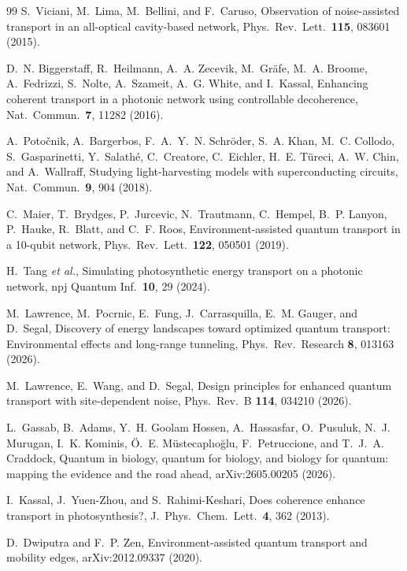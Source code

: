 \documentclass[aps,pre,preprint,floatfix]{revtex4-2}
\begin{document}
\begin{thebibliography}{99}
S.~Viciani, M.~Lima, M.~Bellini, and F.~Caruso,
Observation of noise-assisted transport in an all-optical cavity-based
network,
Phys.\ Rev.\ Lett.\ \textbf{115}, 083601 (2015).

D.~N. Biggerstaff, R.~Heilmann, A.~A. Zecevik, M.~Gr\"{a}fe, M.~A. Broome,
A.~Fedrizzi, S.~Nolte, A.~Szameit, A.~G. White, and I.~Kassal,
Enhancing coherent transport in a photonic network using controllable
decoherence,
Nat.\ Commun.\ \textbf{7}, 11282 (2016).

A.~Poto\v{c}nik, A.~Bargerbos, F.~A.~Y.~N. Schr\"{o}der, S.~A. Khan,
M.~C. Collodo, S.~Gasparinetti, Y.~Salath\'{e}, C.~Creatore, C.~Eichler,
H.~E. T\"{u}reci, A.~W. Chin, and A.~Wallraff,
Studying light-harvesting models with superconducting circuits,
Nat.\ Commun.\ \textbf{9}, 904 (2018).

C.~Maier, T.~Brydges, P.~Jurcevic, N.~Trautmann, C.~Hempel, B.~P. Lanyon,
P.~Hauke, R.~Blatt, and C.~F. Roos,
Environment-assisted quantum transport in a 10-qubit network,
Phys.\ Rev.\ Lett.\ \textbf{122}, 050501 (2019).

H.~Tang \textit{et al.},
Simulating photosynthetic energy transport on a photonic network,
npj Quantum Inf.\ \textbf{10}, 29 (2024).

M.~Lawrence, M.~Pocrnic, E.~Fung, J.~Carrasquilla, E.~M. Gauger, and D.~Segal,
Discovery of energy landscapes toward optimized quantum transport:
Environmental effects and long-range tunneling,
Phys.\ Rev.\ Research \textbf{8}, 013163 (2026).

M.~Lawrence, E.~Wang, and D.~Segal,
Design principles for enhanced quantum transport with site-dependent noise,
Phys.\ Rev.~B \textbf{114}, 034210 (2026).

L.~Gassab, B.~Adams, Y.~H. Goolam Hossen, A.~Hassasfar, O.~Pusuluk,
N.~J. Murugan, I.~K. Kominis, \"{O}.~E. M\"{u}stecapl{\i}o\u{g}lu,
F.~Petruccione, and T.~J.~A. Craddock,
Quantum in biology, quantum for biology, and biology for quantum: mapping the
evidence and the road ahead,
arXiv:2605.00205 (2026).

I.~Kassal, J.~Yuen-Zhou, and S.~Rahimi-Keshari,
Does coherence enhance transport in photosynthesis?,
J.~Phys.\ Chem.\ Lett.\ \textbf{4}, 362 (2013).

D.~Dwiputra and F.~P. Zen,
Environment-assisted quantum transport and mobility edges,
arXiv:2012.09337 (2020).


\end{thebibliography}
\end{document}
